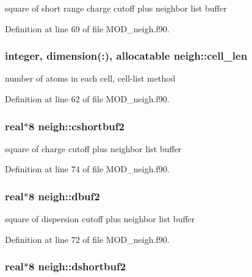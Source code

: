 square of short range charge cutoff plus neighbor list buffer 



Definition at line 69 of file M\-O\-D\-\_\-neigh.\-f90.

\hypertarget{classneigh_abc2a753a0d9494a2e66da45157c9874c}{
\subsubsection[{cell\-\_\-len}]{\setlength{\rightskip}{0pt plus 5cm}integer, dimension(\-:), allocatable neigh\-::cell\-\_\-len}}\label{classneigh_abc2a753a0d9494a2e66da45157c9874c}


number of atoms in each cell, cell-\/list method 



Definition at line 62 of file M\-O\-D\-\_\-neigh.\-f90.

\hypertarget{classneigh_a8b4d64898ca057d264af5504faf124c7}{
\subsubsection[{cshortbuf2}]{\setlength{\rightskip}{0pt plus 5cm}real$\ast$8 neigh\-::cshortbuf2}}\label{classneigh_a8b4d64898ca057d264af5504faf124c7}


square of charge cutoff plus neighbor list buffer 



Definition at line 74 of file M\-O\-D\-\_\-neigh.\-f90.

\hypertarget{classneigh_a55976e0ec479b7cb47341b0b382018ba}{
\subsubsection[{dbuf2}]{\setlength{\rightskip}{0pt plus 5cm}real$\ast$8 neigh\-::dbuf2}}\label{classneigh_a55976e0ec479b7cb47341b0b382018ba}


square of dispersion cutoff plus neighbor list buffer 



Definition at line 72 of file M\-O\-D\-\_\-neigh.\-f90.

\hypertarget{classneigh_a1fda85cc92ca9462671291bce775e41b}{
\subsubsection[{dshortbuf2}]{\setlength{\rightskip}{0pt plus 5cm}real$\ast$8 neigh\-::dshortbuf2}}\label{classneigh_a1fda85cc92ca9462671291bce775e41b}


